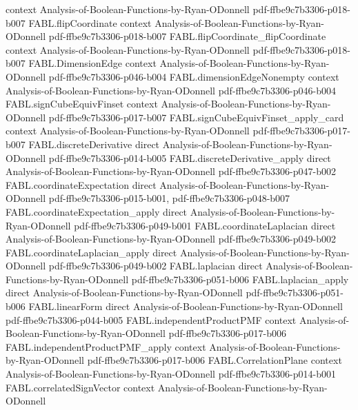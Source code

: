 \begin{theorem}
  {context}
  {Analysis-of-Boolean-Functions-by-Ryan-ODonnell}
  {pdf-ffbe9c7b3306-p018-b007}
\proofstep
  {FABL.flipCoordinate}
  {context}
  {Analysis-of-Boolean-Functions-by-Ryan-ODonnell}
  {pdf-ffbe9c7b3306-p018-b007}
\proofstep
  {FABL.flipCoordinate_flipCoordinate}
  {context}
  {Analysis-of-Boolean-Functions-by-Ryan-ODonnell}
  {pdf-ffbe9c7b3306-p018-b007}
\proofstep
  {FABL.DimensionEdge}
  {context}
  {Analysis-of-Boolean-Functions-by-Ryan-ODonnell}
  {pdf-ffbe9c7b3306-p046-b004}
\proofstep
  {FABL.dimensionEdgeNonempty}
  {context}
  {Analysis-of-Boolean-Functions-by-Ryan-ODonnell}
  {pdf-ffbe9c7b3306-p046-b004}
\proofstep
  {FABL.signCubeEquivFinset}
  {context}
  {Analysis-of-Boolean-Functions-by-Ryan-ODonnell}
  {pdf-ffbe9c7b3306-p017-b007}
\proofstep
  {FABL.signCubeEquivFinset_apply_card}
  {context}
  {Analysis-of-Boolean-Functions-by-Ryan-ODonnell}
  {pdf-ffbe9c7b3306-p017-b007}
\proofstep
  {FABL.discreteDerivative}
  {direct}
  {Analysis-of-Boolean-Functions-by-Ryan-ODonnell}
  {pdf-ffbe9c7b3306-p014-b005}
\proofstep
  {FABL.discreteDerivative_apply}
  {direct}
  {Analysis-of-Boolean-Functions-by-Ryan-ODonnell}
  {pdf-ffbe9c7b3306-p047-b002}
\proofstep
  {FABL.coordinateExpectation}
  {direct}
  {Analysis-of-Boolean-Functions-by-Ryan-ODonnell}
  {pdf-ffbe9c7b3306-p015-b001,
    pdf-ffbe9c7b3306-p048-b007}
\proofstep
  {FABL.coordinateExpectation_apply}
  {direct}
  {Analysis-of-Boolean-Functions-by-Ryan-ODonnell}
  {pdf-ffbe9c7b3306-p049-b001}
\proofstep
  {FABL.coordinateLaplacian}
  {direct}
  {Analysis-of-Boolean-Functions-by-Ryan-ODonnell}
  {pdf-ffbe9c7b3306-p049-b002}
\proofstep
  {FABL.coordinateLaplacian_apply}
  {direct}
  {Analysis-of-Boolean-Functions-by-Ryan-ODonnell}
  {pdf-ffbe9c7b3306-p049-b002}
\proofstep
  {FABL.laplacian}
  {direct}
  {Analysis-of-Boolean-Functions-by-Ryan-ODonnell}
  {pdf-ffbe9c7b3306-p051-b006}
\proofstep
  {FABL.laplacian_apply}
  {direct}
  {Analysis-of-Boolean-Functions-by-Ryan-ODonnell}
  {pdf-ffbe9c7b3306-p051-b006}
\proofstep
  {FABL.linearForm}
  {direct}
  {Analysis-of-Boolean-Functions-by-Ryan-ODonnell}
  {pdf-ffbe9c7b3306-p044-b005}
\proofstep
  {FABL.independentProductPMF}
  {context}
  {Analysis-of-Boolean-Functions-by-Ryan-ODonnell}
  {pdf-ffbe9c7b3306-p017-b006}
\proofstep
  {FABL.independentProductPMF_apply}
  {context}
  {Analysis-of-Boolean-Functions-by-Ryan-ODonnell}
  {pdf-ffbe9c7b3306-p017-b006}
\proofstep
  {FABL.CorrelationPlane}
  {context}
  {Analysis-of-Boolean-Functions-by-Ryan-ODonnell}
  {pdf-ffbe9c7b3306-p014-b001}
\proofstep
  {FABL.correlatedSignVector}
  {context}
  {Analysis-of-Boolean-Functions-by-Ryan-ODonnell}

\end{theorem}
